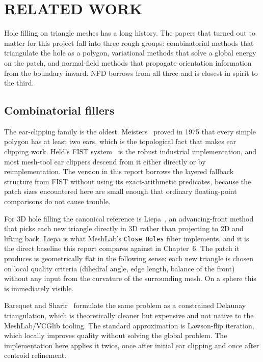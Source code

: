\chapter{RELATED WORK}

Hole filling on triangle meshes has a long history. The papers that turned out to matter for this project fall into three rough groups: combinatorial methods that triangulate the hole as a polygon, variational methods that solve a global energy on the patch, and normal-field methods that propagate orientation information from the boundary inward. NFD borrows from all three and is closest in spirit to the third.

\section{Combinatorial fillers}

The ear-clipping family is the oldest. Meisters~\cite{meisters1975} proved in 1975 that every simple polygon has at least two ears, which is the topological fact that makes ear clipping work. Held's FIST system~\cite{held2001} is the robust industrial implementation, and most mesh-tool ear clippers descend from it either directly or by reimplementation. The version in this report borrows the layered fallback structure from FIST without using its exact-arithmetic predicates, because the patch sizes encountered here are small enough that ordinary floating-point comparisons do not cause trouble.

For 3D hole filling the canonical reference is Liepa~\cite{liepa2003}, an advancing-front method that picks each new triangle directly in 3D rather than projecting to 2D and lifting back. Liepa is what MeshLab's \texttt{Close Holes} filter implements, and it is the direct baseline this report compares against in Chapter~6. The patch it produces is geometrically flat in the following sense: each new triangle is chosen on local quality criteria (dihedral angle, edge length, balance of the front) without any input from the curvature of the surrounding mesh. On a sphere this is immediately visible.

Barequet and Sharir~\cite{barequet1995} formulate the same problem as a constrained Delaunay triangulation, which is theoretically cleaner but expensive and not native to the MeshLab/VCGlib tooling. The standard approximation is Lawson-flip iteration, which locally improves quality without solving the global problem. The implementation here applies it twice, once after initial ear clipping and once after centroid refinement.

